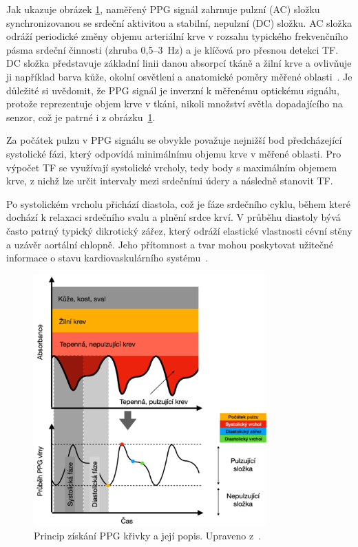 Jak ukazuje obrázek \ref{fig:signalPPG}, naměřený \acs{PPG} signál zahrnuje pulzní (AC) složku synchronizovanou se srdeční aktivitou a stabilní, nepulzní (DC) složku.
AC složka odráží periodické změny objemu arteriální krve v rozsahu typického frekvenčního pásma srdeční činnosti (zhruba 0,5--3~Hz) a je klíčová pro přesnou detekci \acs{TF}.
DC složka představuje základní linii danou absorpcí tkáně a žilní krve a ovlivňuje ji například barva kůže, okolní osvětlení a anatomické poměry měřené oblasti~\cite{ENIKÖ, Park2022}.
Je důležité si uvědomit, že \acs{PPG} signál je inverzní k měřenému optickému signálu, protože reprezentuje objem krve v tkáni, nikoli množství světla dopadajícího na senzor, což je patrné i z obrázku~\ref{fig:signalPPG}.

Za počátek pulzu v \acs{PPG} signálu se obvykle považuje nejnižší bod předcházející systolické fázi, který odpovídá minimálnímu objemu krve v měřené oblasti.
Pro výpočet \acs{TF} se využívají systolické vrcholy, tedy body s maximálním objemem krve, z nichž lze určit intervaly mezi srdečními údery a následně stanovit \acs{TF}.

Po systolickém vrcholu přichází diastola, což je fáze srdečního cyklu, během které dochází k relaxaci srdečního svalu a plnění srdce krví.
V průběhu diastoly bývá často patrný typický dikrotický zářez, který odráží elastické vlastnosti cévní stěny a uzávěr aortální chlopně.
Jeho přítomnost a tvar mohou poskytovat užitečné informace o stavu kardiovaskulárního systému~\cite{Orphanidou2018, Park2022}.

\begin{figure}[hb]
	\centering
	\includegraphics[width=0.8\textwidth]{./obrazky/signalPPG.png}
	\caption[Fiziologický popis PPG signálu]{Princip získání \acs{PPG} křivky a její popis. Upraveno z~\cite{Park2022}.}
	\label{fig:signalPPG}
\end{figure}